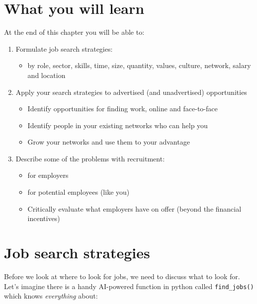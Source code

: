 \documentclass[
]{book}
\providecommand{\tightlist}{%
  \setlength{\itemsep}{0pt}\setlength{\parskip}{0pt}}
\begin{document}
\hypertarget{ilo8}{%
\section{What you will learn}\label{ilo8}}

At the end of this chapter you will be able to:

\begin{enumerate}
\def\labelenumi{\arabic{enumi}.}
\tightlist
\item
  Formulate job search strategies:

  \begin{itemize}
  \tightlist
  \item
    by role, sector, skills, time, size, quantity, values, culture, network, salary and location
  \end{itemize}
\item
  Apply your search strategies to advertised (and unadvertised) opportunities

  \begin{itemize}
  \tightlist
  \item
    Identify opportunities for finding work, online and face-to-face
  \item
    Identify people in your existing networks who can help you
  \item
    Grow your networks and use them to your advantage
  \end{itemize}
\item
  Describe some of the problems with recruitment:

  \begin{itemize}
  \tightlist
  \item
    for employers
  \item
    for potential employees (like you)
  \item
    Critically evaluate what employers have on offer (beyond the financial incentives)
  \end{itemize}
\end{enumerate}

\hypertarget{strategies}{%
\section{Job search strategies}\label{strategies}}

Before we look at where to look for jobs, we need to discuss what to look for. Let's imagine there is a handy AI-powered function in python called \texttt{find\_jobs()} which knows \emph{everything} about:
\end{document}
